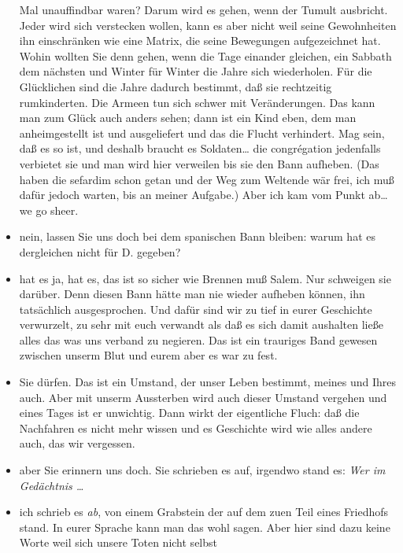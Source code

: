 \documentclass[
]{article}
\begin{document}
\begin{itemize}
  Mal unauffindbar waren? Darum wird es gehen, wenn der Tumult
  ausbricht. Jeder wird sich verstecken wollen, kann es aber nicht weil
  seine Gewohnheiten ihn einschränken wie eine Matrix, die seine
  Bewegungen aufgezeichnet hat. Wohin wollten Sie denn gehen, wenn die
  Tage einander gleichen, ein Sabbath dem nächsten und Winter für Winter
  die Jahre sich wiederholen. Für die Glücklichen sind die Jahre dadurch
  bestimmt, daß sie rechtzeitig rumkinderten. Die Armeen tun sich schwer
  mit Veränderungen. Das kann man zum Glück auch anders sehen; dann ist
  ein Kind eben, dem man anheimgestellt ist und ausgeliefert und das die
  Flucht verhindert. Mag sein, daß es so ist, und deshalb braucht es
  Soldaten\ldots{} die congrégation jedenfalls verbietet sie und man
  wird hier verweilen bis sie den Bann aufheben. (Das haben die sefardim
  schon getan und der Weg zum Weltende wär frei, ich muß dafür jedoch
  warten, bis an meiner Aufgabe.) Aber ich kam vom Punkt ab\ldots{} we
  go sheer.\\
\item
  nein, lassen Sie uns doch bei dem spanischen Bann bleiben: warum hat
  es dergleichen nicht für D. gegeben?\\
\item
  hat es ja, hat es, das ist so sicher wie Brennen muß Salem. Nur
  schweigen sie darüber. Denn diesen Bann hätte man nie wieder aufheben
  können, ihn tatsächlich ausgesprochen. Und dafür sind wir zu tief in
  eurer Geschichte verwurzelt, zu sehr mit euch verwandt als daß es sich
  damit aushalten ließe alles das was uns verband zu negieren. Das ist
  ein trauriges Band gewesen zwischen unserm Blut und eurem aber es war
  zu fest.\\
\item
  Sie dürfen. Das ist ein Umstand, der unser Leben bestimmt, meines und
  Ihres auch. Aber mit unserm Aussterben wird auch dieser Umstand
  vergehen und eines Tages ist er unwichtig. Dann wirkt der eigentliche
  Fluch: daß die Nachfahren es nicht mehr wissen und es Geschichte wird
  wie alles andere auch, das wir vergessen.\\
\item
  aber Sie erinnern uns doch. Sie schrieben es auf, irgendwo stand es:
  \emph{Wer im Gedächtnis \ldots{}}\\
\item
  ich schrieb es \emph{ab}, von einem Grabstein der auf dem zuen Teil
  eines Friedhofs stand. In eurer Sprache kann man das wohl sagen. Aber
  hier sind dazu keine Worte weil sich unsere Toten nicht selbst

\end{itemize}
\end{document}
